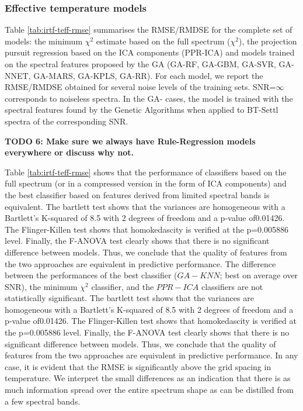 
\subsubsection{Effective temperature models}

Table \ref{tab:irtf-teff-rmse} summarises the RMSE/RMDSE for the
complete set of models: the minimum $\chi^2$ estimate based on the
full spectrum ($\chi^2$), the projection pursuit regression based on
the ICA components (PPR-ICA) and models trained on the spectral
features proposed by the GA (GA-RF, GA-GBM, GA-SVR, GA-NNET, GA-MARS,
GA-KPLS, GA-RR). For each model, we report the RMSE/RMDSE obtained for
several noise levels of the training sets.  SNR=$\infty$ corresponds
to noiseless spectra. In the GA- cases, the model is trained with the
spectral features found by the Genetic Algorithms when applied to
BT-Settl spectra of the corresponding SNR.

{\bf TODO 6: Make sure we always have Rule-Regression models everywhere or
  discuss why not.}
  
Table \ref{tab:irtf-teff-rmse} shows that the performance of classifiers
based on the full spectrum (or in a compressed version in the form of
ICA components) and the best classifier based on features derived from
limited spectral bands is equivalent. The bartlett test shows that the
variances are homogeneous with a Bartlett\textquoteright s K-squared
of 8.5 with 2 degrees of freedom and a p-value of0.01426. The
Flinger-Killen test shows that homokedascity is verified at the
p=0.005886 level. Finally, the F-ANOVA test clearly shows that there
is no significant difference between models. Thus, we conclude that
the quality of features from the two approaches are equivalent in
predictive performance.  The difference between the performances of
the best classifier ($GA-KNN$; best on average over SNR), the minimum
$\chi^2$ classifier, and the $PPR-ICA$ classifiers are not
statistically significant. The bartlett test shows that the variances
are homogeneous with a Bartlett\textquoteright s K-squared of 8.5 with
2 degrees of freedom and a p-value of0.01426. The Flinger-Killen test
shows that homokedascity is verified at the p=0.005886 level. Finally,
the F-ANOVA test clearly shows that there is no significant difference
between models. Thus, we conclude that the quality of features from
the two approaches are equivalent in predictive performance.  In any
case, it is evident that the RMSE is significantly above the grid
spacing in temperature. We interpret the small differences as an
indication that there is as much information spread over the entire
spectrum shape as can be distilled from a few spectral bands.

